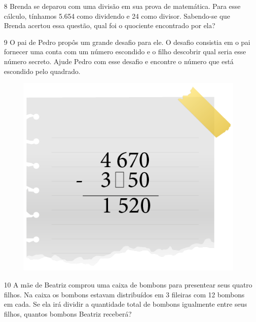 
\num{8} Brenda se deparou com uma divisão em sua prova de matemática. Para
esse cálculo, tínhamos 5.654 como dividendo e 24 como divisor. Sabendo-se
que Brenda acertou essa questão, qual foi o quociente encontrado por ela?

\begin{emptybox}

\vspace{4cm}
\end{emptybox}


\pagebreak

\num{9} O pai de Pedro propôs um grande desafio para ele. O desafio
consistia em o pai fornecer uma conta com um número escondido e o filho descobrir qual seria esse número secreto. Ajude Pedro com esse
desafio e encontre o número que está escondido pelo quadrado.

\begin{figure}[htpb!]
\centering
\includegraphics[width=.4\textwidth]{../ilustracoes/MAT5/SAEB_5ANO_MAT_figura21.png}
\end{figure}

\begin{emptybox}

\vspace{1cm}
\end{emptybox}

\num{10} A mãe de Beatriz comprou uma caixa de bombons para presentear seus
quatro filhos. Na caixa os bombons estavam distribuídos em 3 fileiras
com 12 bombons em cada. Se ela irá dividir a quantidade total de bombons
igualmente entre seus filhos, quantos bombons Beatriz receberá?

